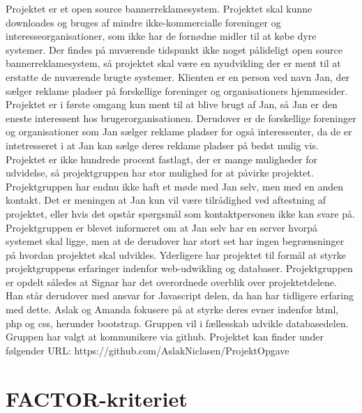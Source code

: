 \documentclass[a4paper,12pt]{article}
\begin{document}
Projektet er et open source bannerreklamesystem. Projektet skal kunne downloades og bruges af mindre ikke-kommercialle foreninger og interesseorganisationer, som ikke har de fornødne midler til at købe dyre systemer. Der findes på nuværende tidspunkt ikke noget pålideligt open source bannerreklamesystem, så projektet skal være en nyudvikling der er ment til at erstatte de nuværende brugte systemer. Klienten er en person ved navn Jan, der sælger reklame pladser på forskellige foreninger og organisationers hjemmesider. Projektet er i første omgang kun ment til at blive brugt af Jan, så Jan er den eneste interessent hos brugerorganisationen. Derudover er de forskellige foreninger og organisationer som Jan sælger reklame pladser for også interessenter, da de er intetresseret i at Jan kan sælge deres reklame pladser på bedst mulig vis. Projektet er ikke hundrede procent fastlagt, der er mange muligheder for udvidelse, så projektgruppen har stor mulighed for at påvirke projektet. Projektgruppen har endnu ikke haft et møde med Jan selv, men med en anden kontakt. Det er meningen at Jan kun vil være tilrådighed ved aftestning af projektet, eller hvis det opstår spørgsmål som kontaktpersonen ikke kan svare på. Projektgruppen er blevet informeret om at Jan selv har en server hvorpå systemet skal ligge, men at de derudover har stort set har ingen begrænsninger på hvordan projektet skal udvikles. 
\newline
Yderligere har projektet til formål at styrke projektgruppens erfaringer indenfor web-udwikling og databaser.
\newline
\newline
Projektgruppen er opdelt således at Signar har det overordnede overblik over projektetdelene. Han står derudover med ansvar for Javascript delen, da han har tidligere erfaring med dette. Aslak og Amanda fokusere på at styrke deres evner indenfor html, php og css, herunder bootstrap. Gruppen vil i fællesskab udvikle databasedelen.
\newline
Gruppen har valgt at kommunikere via github. 
Projektet kan finder under følgender URL: https://github.com/AslakNiclasen/ProjektOpgave 
\newline
\newline 

\section{FACTOR-kriteriet}
\end{document}
